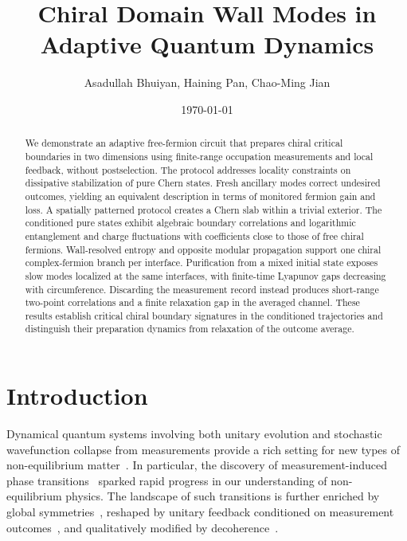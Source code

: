 \documentclass[aps,prb,10pt,twocolumn,superscriptaddress,longbibliography,floatfix]{revtex4-2}
\newcommand{\newtext}[1]{{\color{blue}#1}}
\begin{document}
\raggedbottom

\title{Chiral Domain Wall Modes in Adaptive Quantum Dynamics}
\author{Asadullah Bhuiyan, Haining Pan, Chao-Ming Jian}
\noaffiliation
\date{\today}

\begin{abstract}
\newtext{We demonstrate an adaptive free-fermion circuit that prepares chiral critical boundaries in two dimensions using finite-range occupation measurements and local feedback, without postselection. The protocol addresses locality constraints on dissipative stabilization of pure Chern states. Fresh ancillary modes correct undesired outcomes, yielding an equivalent description in terms of monitored fermion gain and loss. A spatially patterned protocol creates a Chern slab within a trivial exterior. The conditioned pure states exhibit algebraic boundary correlations and logarithmic entanglement and charge fluctuations with coefficients close to those of free chiral fermions. Wall-resolved entropy and opposite modular propagation support one chiral complex-fermion branch per interface. Purification from a mixed initial state exposes slow modes localized at the same interfaces, with finite-time Lyapunov gaps decreasing with circumference. Discarding the measurement record instead produces short-range two-point correlations and a finite relaxation gap in the averaged channel. These results establish critical chiral boundary signatures in the conditioned trajectories and distinguish their preparation dynamics from relaxation of the outcome average.}
\end{abstract}

\maketitle

\setcounter{tocdepth}{2}
\tableofcontents

\section{Introduction}

Dynamical quantum systems involving both unitary evolution and stochastic wavefunction collapse from measurements provide a rich setting for new types of non-equilibrium matter~\cite{PotterVasseur2022,FisherKhemaniNahumVijay2023}.
In particular, the discovery of measurement-induced phase
transitions~\cite{LiChenFisher2018,SkinnerRuhmanNahum2019,ChanNandkishorePretkoSmith2019,LiChenFisher2019,GullansHuse2020}
sparked rapid progress in our understanding of non-equilibrium physics. The landscape of such transitions is further enriched by global symmetries~\cite{SangHsieh2021,BaoChoiAltman2021,LavasaniAlaviradBarkeshli2021,AgrawalEtAl2022,BarrattEtAl2022,MajidyEtAl2023}, reshaped by unitary feedback conditioned on measurement outcomes~\cite{IadecolaEtAl2023,RavindranathEtAl2023,PiroliEtAl2023,SierantTurkeshi2023,ODeaEtAl2024}, and qualitatively modified by
decoherence~\cite{WeinsteinBaoAltman2022,LiSangHsieh2023,LiuLiZhangJian2024,IvakiOjanenMoghaddam2025}.
\end{document}
